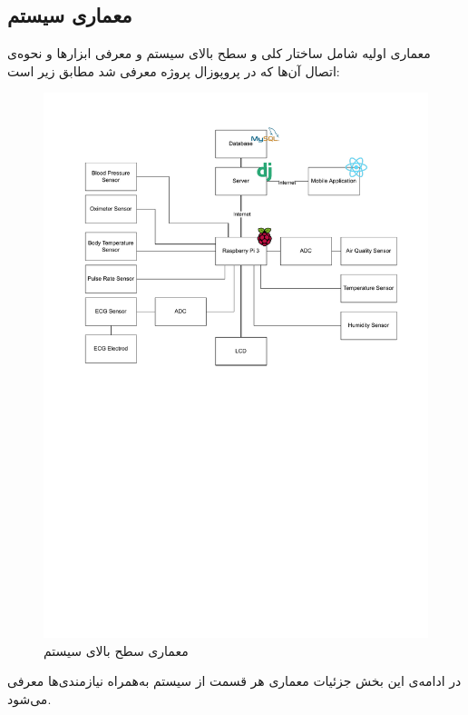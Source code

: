\documentclass[12pt]{article}
\begin{document}
\subsection{معماری سیستم}
معماری اولیه شامل ساختار کلی و سطح بالای سیستم و معرفی ابزارها و نحوه‌ی اتصال آن‌ها که در پروپوزال پروژه معرفی شد مطابق زیر است:
\begin{figure}[h]
	\begin{center}
		\includegraphics[width=.85\textwidth,trim={0 14cm 0 1cm},clip]{initial_arch} %
	\end{center}
	\caption{معماری سطح بالای سیستم}
\end{figure}

در ادامه‌ی این بخش جزئیات معماری هر قسمت از سیستم به‌همراه نیازمندی‌ها معرفی می‌شود.
\end{document}
